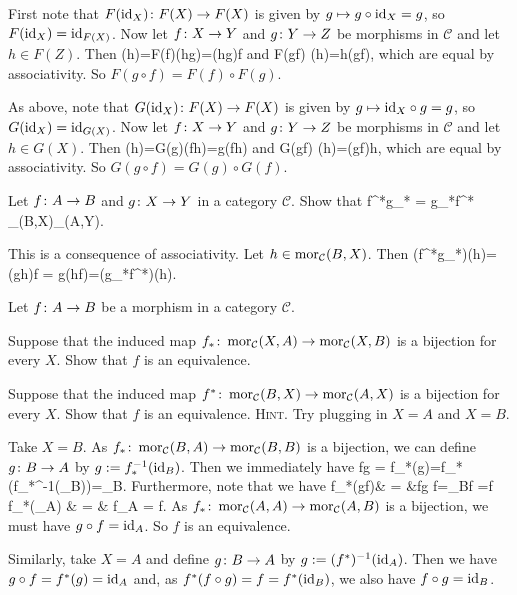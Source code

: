 \bs
\ben[label=(\alph*)]
\item First note that $F(\mathrm{id}_X)\colon F(X)\to F(X)$ is given by $g\mapsto g\circ \mathrm{id}_X=g$, so $F(\mathrm{id}_X)=\mathrm{id}_{F(X)}$. Now let $f\colon X\to Y$ and $g\colon Y\to Z$ be morphisms in $\mathcal{C}$ and let $h\in F(Z)$. Then
\bse
[F(f)\circ F(g)] (h)=F(f)(h\circ g)=(h\circ g)\circ f
\ese
and
\bse
F(g\circ f) (h)=h\circ (g\circ f),
\ese
which are equal by associativity. So $F(g\circ f) =F(f)\circ F(g)$.
\item As above, note that $G(\mathrm{id}_X)\colon F(X)\to F(X)$ is given by $g\mapsto \mathrm{id}_X\circ g=g$, so $G(\mathrm{id}_X)=\mathrm{id}_{G(X)}$. Now let $f\colon X\to Y$ and $g\colon Y\to Z$ be morphisms in $\mathcal{C}$ and let $h\in G(X)$. Then
\bse
[G(g)\circ G(f)] (h)=G(g)(f\circ h)=g\circ (f\circ h)
\ese
and
\bse
G(g\circ f) (h)=(g\circ f)\circ h,
\ese
which are equal by associativity. So $G(g\circ f) =G(g)\circ G(f)$.
\een
\es


\bp
Let $f\colon A \to B$ and $g\colon X\to Y$ in a category $\mathcal{C}$. Show that
\bse
f^*\circ g_* = g_*\circ f^* \cl \mor_{}(B,X)\to \mor_{}(A,Y).
\ese
\ep

\bs
This is a consequence of associativity. Let $h\in \operatorname{mor}_{\mathcal{C}}(B,X)$. Then
(f^*\circ g_*)(h)=(g\circ h)\circ f = g\circ (h\circ f)=(g_*\circ f^*)(h).
\ei
\es

\bp
Let $f\colon A \to B$ be a morphism in a category $\mathcal{C}$.
\ben[label=(\alph*)]
\item Suppose that the induced map $f_* \colon \operatorname{mor}_{\mathcal{C}}(X,A)\to \operatorname{mor}_{\mathcal{C}}(X,B)$ is a bijection for every $X$. Show that $f$ is an equivalence.
\item Suppose that the induced map $f^* \colon \operatorname{mor}_{\mathcal{C}}(B,X)\to \operatorname{mor}_{\mathcal{C}}(A,X)$ is a bijection for every $X$. Show that $f$ is an equivalence.
\een
{\scshape Hint}. Try plugging in $X=A$ and $X=B$.
\ep

\bs
\ben[label=(\alph*)]
\item Take $X=B$. As $f_*\colon \operatorname{mor}_{\mathcal{C}}(B,A)\to \operatorname{mor}_{\mathcal{C}}(B,B)$ is a bijection, we can define $g\colon B\to A$ by $g:=f_*^{-1}(\mathrm{id}_B)$. Then we immediately have
\bse
f\circ g = f_*(g)=f_*(f_*^{-1}(\id_B))=\id_B.
\ese
Furthermore, note that we have
f_*(g\circ f)& = &f\circ g \circ f=\id_B\circ f =f\\
f_*(\id_A) & = & f\circ \id_A = f.
\ei
As $f_*\colon \operatorname{mor}_{\mathcal{C}}(A,A)\to \operatorname{mor}_{\mathcal{C}}(A,B)$ is a bijection, we must have $g\circ f=\mathrm{id}_A$. So $f$ is an equivalence.
\item Similarly, take $X=A$ and define $g\colon B\to A$ by $g:=(f^*)^{-1}(\mathrm{id}_A)$. Then we have $g\circ f=f^*(g)=\mathrm{id}_A$ and, as $f^*(f\circ g)=f=f^*(\mathrm{id}_B)$, we also have $f\circ g=\mathrm{id}_B$.
\een
\es


